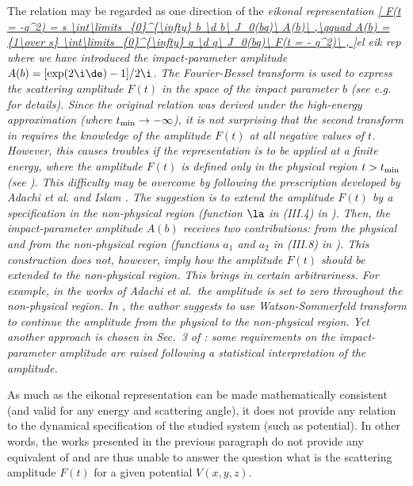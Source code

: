 The relation  may be regarded as one direction of the \em{eikonal representation}
\eqref{
	F(t = -q^2) = s \int\limits_{0}^{\infty} b \d b\ J_0(bq)\ A(b)\ ,\qquad
	A(b) = {1\over s} \int\limits_{0}^{\infty} q \d q\ J_0(bq)\ F(t = - q^2)\ ,
}{el eik rep}
where we have introduced the \em{impact-parameter amplitude} $A(b) = [\exp(2\i\de) - 1] / 2\i$.  The Fourier-Bessel transform is used to express the scattering amplitude $F(t)$ in the space of the impact parameter $b$ (see e.g.~ for details). Since the original relation  was derived under the high-energy approximation (where $t_{\rm min} \to -\infty$), it is not surprising that the second transform in  requires the knowledge of the amplitude $F(t)$ at all negative values of $t$. However, this causes troubles if the representation is to be applied at a finite energy, where the amplitude $F(t)$ is defined only in the physical region $t > t_{\rm min}$ (see ). This difficulty may be overcome by following the prescription developed by Adachi et al.  and Islam . The suggestion is to extend the amplitude $F(t)$ by a specification in the non-physical region (function $\la$ in (III.4) in ). Then, the impact-parameter amplitude $A(b)$ receives two contributions: from the physical and from the non-physical region (functions $a_1$ and $a_2$ in (III.8) in ). This construction does not, however, imply how the amplitude $F(t)$ should be extended to the non-physical region. This brings in certain arbitrariness. For example, in the works of Adachi et al.~the amplitude is set to zero throughout the non-physical region. In , the author suggests to use Watson-Sommerfeld transform to continue the amplitude from the physical to the non-physical region. Yet another approach is chosen in Sec.~3 of : some requirements on the impact-parameter amplitude are raised following a statistical interpretation of the amplitude.

As much as the eikonal representation  can be made mathematically consistent (and valid for any energy and scattering angle), it does not provide any relation to the dynamical specification of the studied system (such as potential). In other words, the works presented in the previous paragraph do not provide any equivalent of  and are thus unable to answer the question what is the scattering amplitude $F(t)$ for a given potential $V(x, y, z)$.


